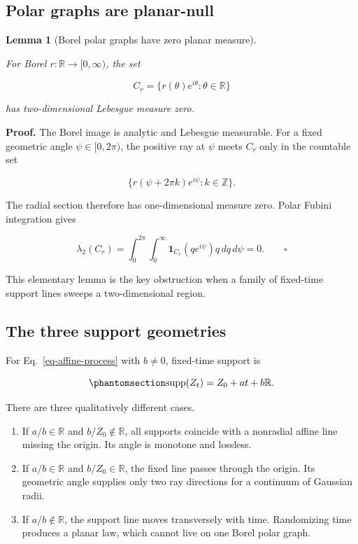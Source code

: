 \documentclass[
  english,
  10pt,
  letterpaper,
  DIV=11,
  numbers=noendperiod]{scrartcl}
\providecommand{\tightlist}{%
  \setlength{\itemsep}{0pt}\setlength{\parskip}{0pt}}
\theoremstyle{definition}
\theoremstyle{plain}
\theoremstyle{plain}
\newtheorem{lemma}{Lemma}[section]
\theoremstyle{remark}
\begin{document}
\subsection{Polar graphs are
planar-null}\label{polar-graphs-are-planar-null}

\begin{lemma}[Borel polar graphs have zero planar
measure]\protect\hypertarget{lem-polar-graph-null}{}\label{lem-polar-graph-null}

For Borel \(r:\mathbb R\to[0,\infty)\), the set

\[
C_r=\{r(\theta)e^{i\theta}:\theta\in\mathbb R\}
\]

has two-dimensional Lebesgue measure zero.

\end{lemma}

\textbf{Proof.} The Borel image is analytic and Lebesgue measurable. For
a fixed geometric angle \(\psi\in[0,2\pi)\), the positive ray at
\(\psi\) meets \(C_r\) only in the countable set

\[
\{r(\psi+2\pi k)e^{i\psi}:k\in\mathbb Z\}.
\]

The radial section therefore has one-dimensional measure zero. Polar
Fubini integration gives

\[
\lambda_2(C_r)
=
\int_0^{2\pi}\int_0^\infty
\mathbf 1_{C_r}(qe^{i\psi})q\,dq\,d\psi
=0.
\qquad\square
\]

This elementary lemma is the key obstruction when a family of fixed-time
support lines sweeps a two-dimensional region.

\subsection{The three support
geometries}\label{the-three-support-geometries}

For Eq.~\ref{eq-affine-process} with \(b\ne0\), fixed-time support is

\begin{equation}\protect\phantomsection\label{eq-fixed-time-support}{
\operatorname{supp}(Z_t)=Z_0+at+b\mathbb R.
}\end{equation}

There are three qualitatively different cases.

\begin{enumerate}
\def\labelenumi{\arabic{enumi}.}
\tightlist
\item
  If \(a/b\in\mathbb R\) and \(b/Z_0\notin\mathbb R\), all supports
  coincide with a nonradial affine line missing the origin. Its angle is
  monotone and lossless.
\item
  If \(a/b\in\mathbb R\) and \(b/Z_0\in\mathbb R\), the fixed line
  passes through the origin. Its geometric angle supplies only two ray
  directions for a continuum of Gaussian radii.
\item
  If \(a/b\notin\mathbb R\), the support line moves transversely with
  time. Randomizing time produces a planar law, which cannot live on one
  Borel polar graph.
\end{enumerate}
\end{document}
